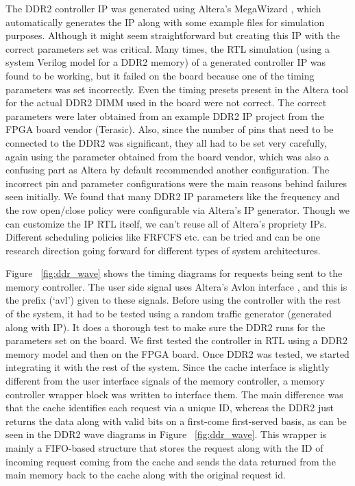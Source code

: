 
The DDR2 controller IP was generated using Altera's MegaWizard \cite{quartus}, which automatically generates the IP along with some example files for simulation purposes. Although it might seem straightforward but creating this IP with the correct parameters set was critical. Many times, the RTL simulation (using a system Verilog model for a DDR2 memory) of a generated controller IP was found to be working, but it failed on the board because one of the timing parameters was set incorrectly. Even the timing presets present in the Altera tool for the actual DDR2 DIMM used in the board were not correct. The correct parameters were later obtained from an example DDR2 IP project from the FPGA board vendor (Terasic). Also, since the number of pins that need to be connected to the DDR2 was significant, they all had to be set very carefully, again using the parameter obtained from the board vendor, which was also a confusing part as Altera by default recommended another configuration. The incorrect pin and parameter configurations were the main reasons behind failures seen initially. We found that many DDR2 IP parameters like the frequency and the row open/close policy were configurable via Altera's IP generator. Though we can customize the IP RTL itself, we can't reuse all of Altera's propriety IPs. Different scheduling policies like FRFCFS etc. can be tried and can be one research direction going forward for different types of system architectures.

Figure ~\ref{fig:ddr_wave} shows the timing diagrams for requests being sent to the memory controller. The user side signal uses Altera's Avlon interface \cite{ddr2}, and this is the prefix (`avl') given to these signals.
Before using the controller with the rest of the system, it had to be tested using a random traffic generator (generated along with IP). It does a thorough test to make sure the DDR2 runs for the parameters set on the board. We first tested the controller in RTL using a DDR2 memory model and then on the FPGA board. Once DDR2 was tested, we started integrating it with the rest of the system. Since the cache interface is slightly different from the user interface signals of the memory controller, a memory controller wrapper block was written to interface them. The main difference was that the cache identifies each request via a unique ID, whereas the DDR2 just returns the data along with valid bits on a first-come first-served basis, as can be seen in the DDR2 wave diagrams in Figure ~\ref{fig:ddr_wave}. This wrapper is mainly a FIFO-based structure that stores the request along with the ID of incoming request coming from the cache and sends the data returned from the main memory back to the cache along with the original request id.

